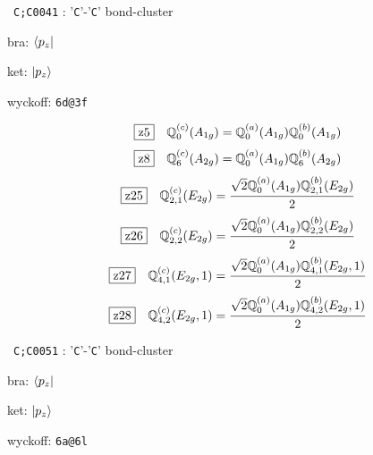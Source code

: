 \documentclass[fleqn,10pt,landscape]{jsarticle}
\begin{document}
\noindent\textbullet\, \texttt{C;C\texttt{}004\texttt{}1} : '\texttt{C}'-'\texttt{C}' bond-cluster

\noindent\quad * bra: $\bra{p_{z}}$

\noindent\quad * ket: $\ket{p_{z}}$

\noindent\quad * wyckoff: \texttt{6d@3f}

\begin{dmath*}
\hspace*{3mm}\fbox{z5}\quad \mathbb{Q}_{0}^{(c)}(A_{1g})=\mathbb{Q}_{0}^{(a)}(A_{1g}) \mathbb{Q}_{0}^{(b)}(A_{1g})
\end{dmath*}
\begin{dmath*}
\hspace*{3mm}\fbox{z8}\quad \mathbb{Q}_{6}^{(c)}(A_{2g})=\mathbb{Q}_{0}^{(a)}(A_{1g}) \mathbb{Q}_{6}^{(b)}(A_{2g})
\end{dmath*}
\begin{dmath*}
\hspace*{3mm}\fbox{z25}\quad \mathbb{Q}_{2,1}^{(c)}(E_{2g})=\frac{\sqrt{2} \mathbb{Q}_{0}^{(a)}(A_{1g}) \mathbb{Q}_{2,1}^{(b)}(E_{2g})}{2}
\end{dmath*}
\begin{dmath*}
\hspace*{3mm}\fbox{z26}\quad \mathbb{Q}_{2,2}^{(c)}(E_{2g})=\frac{\sqrt{2} \mathbb{Q}_{0}^{(a)}(A_{1g}) \mathbb{Q}_{2,2}^{(b)}(E_{2g})}{2}
\end{dmath*}
\begin{dmath*}
\hspace*{3mm}\fbox{z27}\quad \mathbb{Q}_{4,1}^{(c)}(E_{2g},1)=\frac{\sqrt{2} \mathbb{Q}_{0}^{(a)}(A_{1g}) \mathbb{Q}_{4,1}^{(b)}(E_{2g},1)}{2}
\end{dmath*}
\begin{dmath*}
\hspace*{3mm}\fbox{z28}\quad \mathbb{Q}_{4,2}^{(c)}(E_{2g},1)=\frac{\sqrt{2} \mathbb{Q}_{0}^{(a)}(A_{1g}) \mathbb{Q}_{4,2}^{(b)}(E_{2g},1)}{2}
\end{dmath*}
\vspace{5mm}

\noindent\textbullet\, \texttt{C;C\texttt{}005\texttt{}1} : '\texttt{C}'-'\texttt{C}' bond-cluster

\noindent\quad * bra: $\bra{p_{z}}$

\noindent\quad * ket: $\ket{p_{z}}$

\noindent\quad * wyckoff: \texttt{6a@6l}
\end{document}
